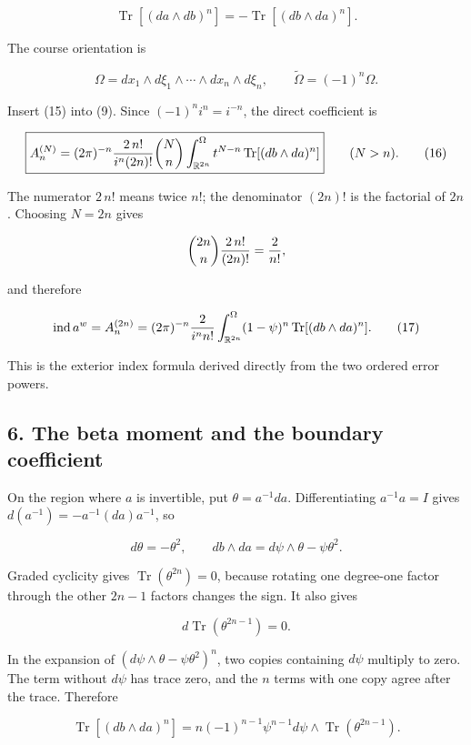 \documentclass[
  11pt,
]{article}
\begin{document}
\[
 \operatorname{Tr}[(da\wedge db)^n]
   =-\operatorname{Tr}[(db\wedge da)^n].
\]

The course orientation is

\[
 \Omega=dx_1\wedge d\xi_1\wedge\cdots\wedge
          dx_n\wedge d\xi_n,
 \qquad
 \widetilde\Omega=(-1)^n\Omega.
\]

Insert (15) into (9). Since \((-1)^ni^n=i^{-n}\), the direct coefficient
is

\[
 \boxed{
 A_n^{(N)}
  =(2\pi)^{-n}{2\,n!\over i^n(2n)!}\binom Nn
   \int_{\mathbb R^{2n}}^{\Omega}
      t^{N-n}\operatorname{Tr}[(db\wedge da)^n]
 }
 \qquad(N>n).
 \tag{16}
\]

The numerator \(2\,n!\) means twice \(n!\); the denominator \((2n)!\) is
the factorial of \(2n\). Choosing \(N=2n\) gives

\[
 \binom{2n}{n}{2\,n!\over(2n)!}={2\over n!},
\]

and therefore

\[
 \operatorname{ind}a^w
  =A_n^{(2n)}
  =(2\pi)^{-n}{2\over i^n n!}
    \int_{\mathbb R^{2n}}^{\Omega}
      (1-\psi)^n\operatorname{Tr}[(db\wedge da)^n].
 \tag{17}
\]

This is the exterior index formula derived directly from the two ordered
error powers.

\subsection{6. The beta moment and the boundary
coefficient}\label{the-beta-moment-and-the-boundary-coefficient}

On the region where \(a\) is invertible, put \(\theta=a^{-1}da\).
Differentiating \(a^{-1}a=I\) gives \(d(a^{-1})=-a^{-1}(da)a^{-1}\), so

\[
 d\theta=-\theta^2,
 \qquad
 db\wedge da=d\psi\wedge\theta-\psi\theta^2.
\]

Graded cyclicity gives \(\operatorname{Tr}(\theta^{2n})=0\), because
rotating one degree-one factor through the other \(2n-1\) factors
changes the sign. It also gives

\[
 d\operatorname{Tr}(\theta^{2n-1})=0.
\]

In the expansion of \((d\psi\wedge\theta-\psi\theta^2)^n\), two copies
containing \(d\psi\) multiply to zero. The term without \(d\psi\) has
trace zero, and the \(n\) terms with one copy agree after the trace.
Therefore

\[
 \operatorname{Tr}[(db\wedge da)^n]
   =n(-1)^{n-1}\psi^{n-1}d\psi\wedge
       \operatorname{Tr}(\theta^{2n-1}).
\]
\end{document}
